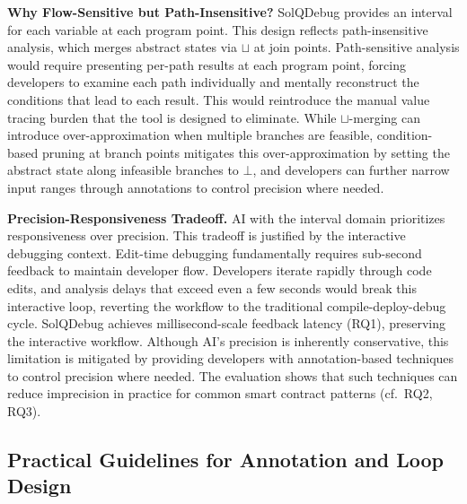 \documentclass[pdflatex,sn-basic]{sn-jnl}%
\theoremstyle{thmstyleone}%
\theoremstyle{thmstyletwo}%
\theoremstyle{thmstylethree}%
\begin{document}
\smallskip
\noindent\textbf{Why Flow-Sensitive but Path-Insensitive?}
SolQDebug provides an interval for each variable at each program point.
This design reflects path-insensitive analysis, which merges abstract states via $\sqcup$ at join points.
Path-sensitive analysis would require presenting per-path results at each program point,
forcing developers to examine each path individually and mentally reconstruct the conditions that lead to each result.
This would reintroduce the manual value tracing burden that the tool is designed to eliminate.
While $\sqcup$-merging can introduce over-approximation when multiple branches are feasible,
condition-based pruning at branch points mitigates this over-approximation by setting the abstract state along infeasible branches to $\bot$,
and developers can further narrow input ranges through annotations to control precision where needed.

\smallskip
\noindent\textbf{Precision-Responsiveness Tradeoff.}
AI with the interval domain prioritizes responsiveness over precision. This tradeoff is justified
by the interactive debugging context. Edit-time debugging fundamentally requires sub-second
feedback to maintain developer flow. Developers iterate rapidly through code edits,
and analysis delays that exceed even a few seconds would break this interactive loop,
reverting the workflow to the traditional compile-deploy-debug cycle.
SolQDebug achieves millisecond-scale feedback latency (RQ1), preserving the interactive workflow.
Although AI's precision is inherently conservative, this limitation is mitigated
by providing developers with annotation-based techniques to control precision where needed.
The evaluation shows that such techniques can reduce imprecision in practice for common
smart contract patterns (cf.\ RQ2, RQ3).
\vspace{0.25em}

\subsection{Practical Guidelines for Annotation and Loop Design}
\end{document}

